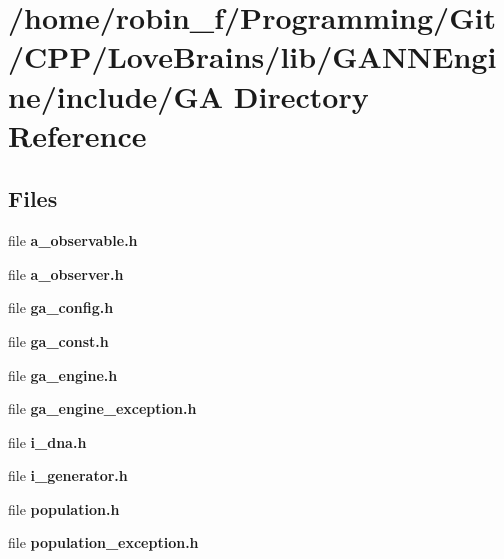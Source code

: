\section{/home/robin\+\_\+f/\+Programming/\+Git/\+C\+P\+P/\+Love\+Brains/lib/\+G\+A\+N\+N\+Engine/include/\+G\+A Directory Reference}
\label{dir_6f096ac45079babe178936427242a860}
\subsection*{Files}
\begin{DoxyCompactItemize}
\item 
file {\bfseries a\+\_\+observable.\+h}
\item 
file {\bfseries a\+\_\+observer.\+h}
\item 
file {\bfseries ga\+\_\+config.\+h}
\item 
file {\bfseries ga\+\_\+const.\+h}
\item 
file {\bfseries ga\+\_\+engine.\+h}
\item 
file {\bfseries ga\+\_\+engine\+\_\+exception.\+h}
\item 
file {\bfseries i\+\_\+dna.\+h}
\item 
file {\bfseries i\+\_\+generator.\+h}
\item 
file {\bfseries population.\+h}
\item 
file {\bfseries population\+\_\+exception.\+h}
\end{DoxyCompactItemize}
